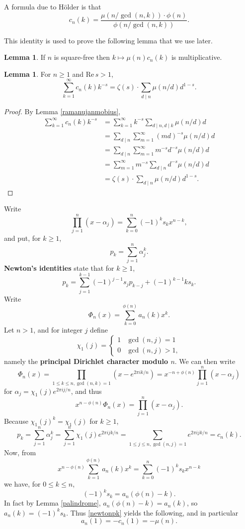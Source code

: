\documentclass{article}
\def\Re{\ensuremath{\mathrm{Re}}\,}
\theoremstyle{definition}
\newtheorem{lemma}[theorem]{Lemma}
\theoremstyle{definition}
\begin{document}
A formula due to H\"older \cite[p.~110, Theorem 4.1]{montgomery} is that  
\begin{equation}
c_n(k) = \frac{\mu(n/\gcd(n,k))\cdot \phi(n)}{\phi(n/\gcd(n,k))}.
\label{holder}
\end{equation}

This identity is used to prove the following lemma that we  use later.

\begin{lemma}
If $n$ is square-free then $k \mapsto \mu(n) c_n(k)$ is multiplicative. 
\label{squarefree}
\end{lemma}



\begin{lemma}
For $n \geq 1$ and $\Re s>1$,
\[
\sum_{k=1}^\infty c_n(k) k^{-s} = \zeta(s) \cdot \sum_{d \mid n} \mu(n/d) d^{1-s}.
\]
\label{ramanujandirichlet}
\end{lemma}
\begin{proof}
By Lemma \ref{ramanujanmobius},
\begin{align*}
\sum_{k=1}^\infty c_n(k) k^{-s} &=\sum_{k=1}^\infty k^{-s} \sum_{d \mid n, d \mid k} \mu(n/d) d\\
&=\sum_{d \mid n} \sum_{m=1}^\infty (md)^{-s} \mu(n/d) d\\
&=\sum_{d \mid n} \sum_{m=1}^\infty m^{-s} d^{-s} \mu(n/d) d\\
&=\sum_{m=1}^\infty m^{-s} \sum_{d \mid n} d^{-s} \mu(n/d) d\\
&=\zeta(s) \cdot \sum_{d \mid n} \mu(n/d) d^{1-s}.
\end{align*}
\end{proof}



Write
\[
\prod_{j=1}^n (x-\alpha_j) = \sum_{k=0}^n (-1)^k s_k x^{n-k},
\]
and put, for $k \geq 1$,
\[
p_k = \sum_{j=1}^n \alpha_j^k.
\]
\textbf{Newton's identities} \cite[p.~32, Proposition 3.4]{escofier} state that for $k \geq 1$,
\begin{equation}
p_k = \sum_{j=1}^{k-1} (-1)^{j-1} s_j p_{k-j} + (-1)^{k-1} k s_k.
\label{newtonpk}
\end{equation}
Write
\[
\Phi_n(x) = \sum_{k=0}^{\phi(n)} a_n(k) x^k.
\]
Let $n > 1$, and for  integer $j$ define
\[
\chi_1(j) = \begin{cases}
1&\gcd(n,j)=1\\
0&\gcd(n,j)>1,
\end{cases}
\]
namely the \textbf{principal Dirichlet character modulo $n$}. 
We can then write 
\[
\Phi_n(x) = \prod_{1 \leq k \leq n, \gcd(n,k)=1} (x-e^{2\pi ik/n})
=x^{-n+\phi(n)}  \prod_{j=1}^n (x-\alpha_j)
\]
for
 $\alpha_j = \chi_1(j) e^{2\pi ij/n}$, and thus
 \[
x^{n-\phi(n)} \Phi_n(x) = \prod_{j=1}^n (x-\alpha_j).
 \]
Because $\chi_1(j)^k=\chi_1(j)$ for $k \geq 1$,
\[
p_k = \sum_{j=1}^n \alpha_j^k = \sum_{j=1}^n \chi_1(j) e^{2\pi ijk/n}
=\sum_{1 \leq j \leq n, \gcd(n,j)=1} e^{2\pi ijk/n} = c_n(k).
\]
Now, from
\[
x^{n-\phi(n)} \sum_{k=1}^{\phi(n)}  a_n(k) x^k =  \sum_{k=0}^n (-1)^k s_k x^{n-k}
\]
we have, for $0 \leq k \leq n$,
\[
(-1)^k s_k = a_n(\phi(n)-k).
\]
In fact by Lemma \ref{palindrome}, $a_n(\phi(n)-k)=a_n(k)$, so $a_n(k) = (-1)^k s_k$. 
Thus \eqref{newtonpk} yields the following,
and in particular 
\[
a_n(1) = -c_n(1) = -\mu(n).
\]
\end{document}
